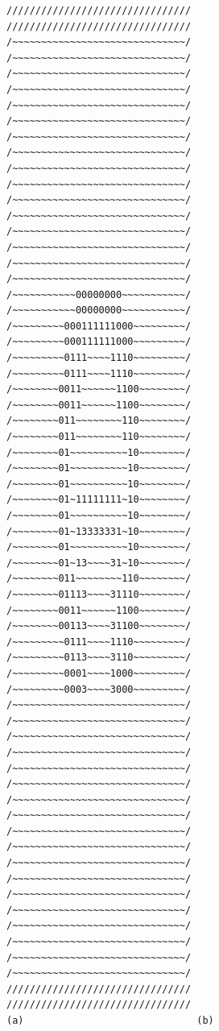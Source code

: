 \documentclass[12pt]{article}
\begin{document}
\begin{figure}[htp]
\begin{minipage}{0.5\linewidth}{\tiny
\begin{verbatim}
//////////////////////////////// ////////////////////////////////
/~~~~~~~~~~~~~~~~~~~~~~~~~~~~~~/ /~~~~~~~~~~~~~~~~~~~~~~~~~~~~~~/
/~~~~~~~~~~~~~~~~~~~~~~~~~~~~~~/ /~~~~~~~~~~~~~~~~~~~~~~~~~~~~~~/
/~~~~~~~~~~~~~~~~~~~~~~~~~~~~~~/ /~~~~~~~~~~~~~~~~~~~~~~~~~~~~~~/
/~~~~~~~~~~~~~~~~~~~~~~~~~~~~~~/ /~~~~~~~~~~~~~~~~~~~~~~~~~~~~~~/
/~~~~~~~~~~~~~~~~~~~~~~~~~~~~~~/ /~~~~~~~~~~~~~~~~~~~~~~~~~~~~~~/
/~~~~~~~~~~~~~~~~~~~~~~~~~~~~~~/ /~~~~~~~~~~~~~~~~~~~~~~~~~~~~~~/
/~~~~~~~~~~~~~~~~~~~~~~~~~~~~~~/ /~~~~~~~~~~~~~~~~~~~~~~~~~~~~~~/
/~~~~~~~~~~~~~~~~~~~~~~~~~~~~~~/ /~~~~~~~~~~~~~~~~~~~~~~~~~~~~~~/
/~~~~~~~~~~~00000000~~~~~~~~~~~/ /~~~~~~~~~~~00000000~~~~~~~~~~~/
/~~~~~~~~~000111111000~~~~~~~~~/ /~~~~~~~~~000111111000~~~~~~~~~/
/~~~~~~~~~0111~~~~1110~~~~~~~~~/ /~~~~~~~~~0111~~~~1110~~~~~~~~~/
/~~~~~~~~0011~~~~~~1100~~~~~~~~/ /~~~~~~~~0011~~~~~~1100~~~~~~~~/
/~~~~~~~~011~~~~~~~~110~~~~~~~~/ /~~~~~~~~011~~~~~~~~110~~~~~~~~/
/~~~~~~~~01~~~~~~~~~~10~~~~~~~~/ /~~~~~~~~01~~~~~~~~~~10~~~~~~~~/
/~~~~~~~~01~~~~~~~~~~10~~~~~~~~/ /~~~~~~~~01~11111111~10~~~~~~~~/
/~~~~~~~~01~~~~~~~~~~10~~~~~~~~/ /~~~~~~~~01~13333331~10~~~~~~~~/
/~~~~~~~~01~~~~~~~~~~10~~~~~~~~/ /~~~~~~~~01~13~~~~31~10~~~~~~~~/
/~~~~~~~~011~~~~~~~~110~~~~~~~~/ /~~~~~~~~01113~~~~31110~~~~~~~~/
/~~~~~~~~0011~~~~~~1100~~~~~~~~/ /~~~~~~~~00113~~~~31100~~~~~~~~/
/~~~~~~~~~0111~~~~1110~~~~~~~~~/ /~~~~~~~~~0113~~~~3110~~~~~~~~~/
/~~~~~~~~~0001~~~~1000~~~~~~~~~/ /~~~~~~~~~0003~~~~3000~~~~~~~~~/
/~~~~~~~~~~~~~~~~~~~~~~~~~~~~~~/ /~~~~~~~~~~~~~~~~~~~~~~~~~~~~~~/
/~~~~~~~~~~~~~~~~~~~~~~~~~~~~~~/ /~~~~~~~~~~~~~~~~~~~~~~~~~~~~~~/
/~~~~~~~~~~~~~~~~~~~~~~~~~~~~~~/ /~~~~~~~~~~~~~~~~~~~~~~~~~~~~~~/
/~~~~~~~~~~~~~~~~~~~~~~~~~~~~~~/ /~~~~~~~~~~~~~~~~~~~~~~~~~~~~~~/
/~~~~~~~~~~~~~~~~~~~~~~~~~~~~~~/ /~~~~~~~~~~~~~~~~~~~~~~~~~~~~~~/
/~~~~~~~~~~~~~~~~~~~~~~~~~~~~~~/ /~~~~~~~~~~~~~~~~~~~~~~~~~~~~~~/
/~~~~~~~~~~~~~~~~~~~~~~~~~~~~~~/ /~~~~~~~~~~~~~~~~~~~~~~~~~~~~~~/
/~~~~~~~~~~~~~~~~~~~~~~~~~~~~~~/ /~~~~~~~~~~~~~~~~~~~~~~~~~~~~~~/
/~~~~~~~~~~~~~~~~~~~~~~~~~~~~~~/ /~~~~~~~~~~~~~~~~~~~~~~~~~~~~~~/
//////////////////////////////// ////////////////////////////////
(a)                              (b)
\end{verbatim}
}\end{minipage}
\begin{minipage}{0.5\linewidth}

\end{minipage}
\end{figure}
\end{document}
